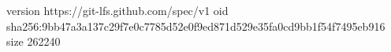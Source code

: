 version https://git-lfs.github.com/spec/v1
oid sha256:9bb47a3a137c29f7e0c7785d52e0f9ed871d529e35fa0cd9bb1f54f7495eb916
size 262240
